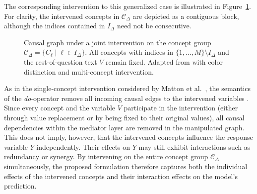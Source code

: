 The corresponding intervention to this generalized case is illustrated in Figure~\ref{fig:dgp_joint_intervened}. For clarity, the intervened concepts in $\mathcal{C}_{\Delta}$ are depicted as a contiguous block, although the indices contained in $I_{\Delta}$ need not be consecutive.

\begin{figure}[ht]
	\centering
	
	\caption{Causal graph under a joint intervention on the concept group $\mathcal{C}_{\Delta}=\{C_\ell \mid \ell \in I_{\Delta}\}$. All concepts with indices in $\{1,\dots,M\}\setminus I_{\Delta}$ and the rest-of-question text $V$ remain fixed. Adapted from \cite{mattonWalkTalkMeasuring2024} with color distinction and multi-concept intervention.}
	\label{fig:dgp_joint_intervened}
\end{figure}

As in the single-concept intervention considered by Matton et al.~\cite{mattonWalkTalkMeasuring2024}, the semantics of the \emph{do}-operator remove all incoming causal edges to the intervened variables \cite{pearlCausality2009}. Since every concept and the variable $V$ participate in the intervention (either through value replacement or by being fixed to their original values), all causal dependencies within the mediator layer are removed in the manipulated graph. This does not imply, however, that the intervened concepts influence the response variable $Y$ independently. Their effects on $Y$ may still exhibit interactions such as redundancy or synergy. By intervening on the entire concept group $\mathcal{C}_{\Delta}$ simultaneously, the proposed formulation therefore captures both the individual effects of the intervened concepts and their interaction effects on the model's prediction.
